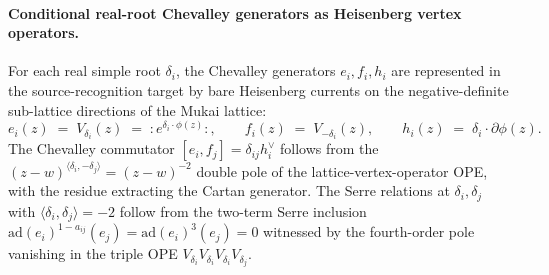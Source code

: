 \paragraph{Conditional real-root Chevalley generators as Heisenberg vertex operators.}
For each real simple root $\delta_i$, the Chevalley generators
$e_i,f_i,h_i$ are represented in the source-recognition target by
bare Heisenberg currents on the
negative-definite sub-lattice directions of the Mukai lattice:
\begin{equation}
\label{eq:voa-real-root-generators}
  e_i(z) \;=\; V_{\delta_i}(z) \;=\; {:}e^{\delta_i\cdot\phi(z)}{:}, \qquad
  f_i(z) \;=\; V_{-\delta_i}(z), \qquad
  h_i(z) \;=\; \delta_i\cdot\partial\phi(z).
\end{equation}
The Chevalley commutator $[e_i,f_j] = \delta_{ij}h_i^\vee$ follows from
the $(z-w)^{\langle\delta_i,-\delta_j\rangle} = (z-w)^{-2}$ double pole
of the lattice-vertex-operator OPE, with the residue extracting the
Cartan generator. The Serre relations at $\delta_i,\delta_j$ with
$\langle\delta_i,\delta_j\rangle = -2$ follow from the two-term Serre
inclusion $\mathrm{ad}(e_i)^{1 - a_{ij}}(e_j) = \mathrm{ad}(e_i)^3(e_j) = 0$
witnessed by the fourth-order pole vanishing in the triple OPE
$V_{\delta_i}V_{\delta_i}V_{\delta_i}V_{\delta_j}$.

